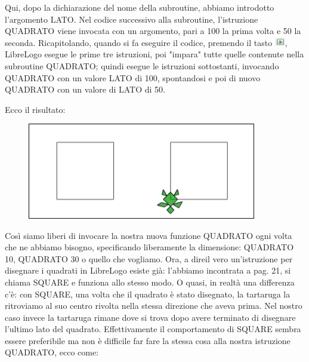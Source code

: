 \begin{minipage}{0.45\textwidth}
\color{black}Qui, dopo la dichiarazione del nome della subroutine, abbiamo introdotto l'argomento \color{magenta}LATO\color{black}. Nel codice successivo alla subroutine, l'istruzione QUADRATO viene invocata con un argomento, pari a \color{magenta}100 \color{black}la prima volta e \color{magenta}50 \color{black}la seconda. 
Ricapitolando, quando si fa eseguire il codice, premendo il tasto \includegraphics[height=1em]{./images/incapsulare/PlayLO.png}, LibreLogo esegue le prime tre istruzioni, poi "impara" tutte quelle contenute nella subroutine QUADRATO; quindi esegue le istruzioni sottostanti, invocando QUADRATO con un valore \color{magenta}LATO \color{black}di \color{magenta}100\color{black}, spontandosi e poi di nuovo QUADRATO con un valore di \color{magenta}LATO \color{black}di \color{magenta}50\color{black}. 
\end{minipage} \hfill

\vskip 0.5cm

Ecco il risultato:

\vskip 0.5cm

\begin{figure}[H]
   \includegraphics[width=10.0cm,trim=4 4 8 4,clip]{./images/incapsulare/incapsulare-2.png}
   \label{inc-3}
\end{figure}

\vskip 0.5cm

Così siamo liberi di invocare la nostra nuova funzione QUADRATO ogni volta che ne abbiamo bisogno, specificando liberamente la dimensione: QUADRATO 10, QUADRATO 30  o quello che vogliamo. Ora, a direil vero un'istruzione per disegnare i quadrati in LibreLogo esiste già: l'abbiamo incontrata a pag. 21, si chiama SQUARE e funziona allo stesso modo. O quasi, in realtà una differenza c'è: con SQUARE, una volta che il quadrato è stato disegnato, la tartaruga la ritroviamo al suo centro rivolta nella stessa direzione che aveva prima. Nel nostro caso invece la tartaruga rimane dove si trova dopo avere terminato di disegnare l'ultimo lato del quadrato. Effettivamente il comportamento di SQUARE sembra essere preferibile ma non è difficile far fare la stessa cosa alla nostra istruzione QUADRATO, ecco come:

